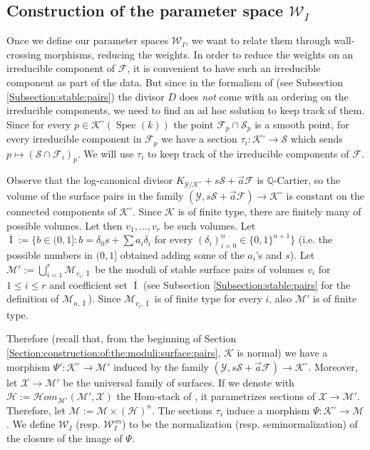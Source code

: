 \documentclass[11pt]{amsart}
\newcommand{\cE}{\mathcal{W}}
\newcommand{\sF}{\mathscr{F}}
\newcommand{\sH}{\mathscr{H}}
\newcommand{\sM}{\mathscr{M}}
\newcommand{\sS}{\mathscr{S}}
\newcommand{\spec}{\operatorname{Spec}}
\newcommand{\Kg}{\mathcal{K}}
\newcommand{\sY}{\mathscr{Y}}
\newcommand{\I}{\operatorname{I}}
\theoremstyle{definition}
\begin{document}
\subsection{Construction of the parameter space $\cE_I$}\label{Subsection:construction:parameter:space:EI}
Once we define our parameter spaces $\cE_I$, we want to relate them through wall-crossing morphisms, reducing the weights. In order to reduce the weights on an irreducible component of $\sF$, it is convenient to have such an irreducible component as part of the data. But since in the formalism of \cite{KP} (see Subsection \ref{Subsection:stable:pairs}) the divisor $D$ does \emph{not} come with an ordering on the irreducible components, we need to find an ad hoc solution to keep track of them. 
Since for every $p \in \Kg^\circ(\spec(k))$ the point $\sF_p \cap \sS_p$ is a smooth point, for every irreducible component in $\sF_p$ we have a section $\tau_i:\Kg^\circ \to \sS$ which sends $p \mapsto (\sS \cap \sF_i)_p$. We will use $\tau_i$ to keep track of the irreducible components of $\sF$. 


Observe that the
log-canonical divisor $K_{\sY/\Kg^\circ}+s\sS+\vec{a}\sF$ is $\mathbb{Q}$-Cartier, so the volume of the surface pairs in the family
$(\sY,s\sS+\vec{a}\sF) \to \Kg^\circ$ is constant on the connected components of $\Kg^\circ$. Since $\Kg$ is of finite type,
there are finitely many of possible volumes.
Let then $v_1,...,v_r$ be such volumes. Let 
$\overline{\I}:=\{b \in (0,1]: b=  \delta_{0}s+\sum a_i \delta_{i} $ for every $(\delta_{i})_{i=0}^n \in \{0,1\}^{n+1}\}$ (i.e. the possible numbers in $(0,1]$ obtained adding some of the $a_i$'s and $s$). Let $\mathcal{M}':=\bigcup_{i=1}^r \mathscr{M}_{v_i,\overline{\I}}$ be
the moduli of stable surface pairs of volumes $v_i$ for $1\le i \le r$ and
coefficient set $\overline{\I}$ (see Subsection \ref{Subsection:stable:pairs} for the definition of $\mathscr{M}_{n,\overline{\I}}$). Since $\sM_{v_i,\overline{\I}}$ is of finite type for every $i$, also $\mathcal{M}'$ is of finite type.


Therefore (recall that, from the beginning of Section \ref{Section:construction:of:the:moduli:surface:pairs}, $\Kg$ is normal) we have a morphism
$\Psi':\Kg^\circ \to \mathcal{M}'$
induced by the family $(\sY,s\sS+\vec{a}\sF) \to \Kg^\circ$.
Moreover, let $\mathcal{X} \to \mathcal{M}'$ be the universal family of surfaces. If we denote with
$\sH:=\sH om_{\mathcal{M}'}(\mathcal{M}',\mathcal{X})$ the Hom-stack of \cite{Homstack}, it parametrizes sections of $\mathcal{X} \to \mathcal{M}'$. Therefore, let $\mathcal{M}:=\mathcal{M} \times (\sH)^n$. The sections $\tau_i$ induce a morphism $\Psi: \Kg^\circ \to \mathcal{M}$.
 We define $\mathcal{W}_I$ (resp. $\cE_I^{sn}$) to be the normalization
 (resp. seminormalization) of the closure of the image of $\Psi$. 
 
\end{document}
